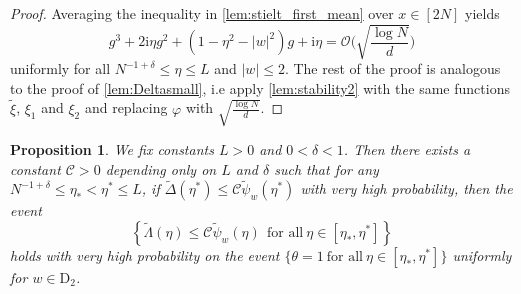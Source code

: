 \documentclass[10pt,a4paper]{amsart}
\newcommand{\ii}{\mathrm{i}}
\newcommand{\abs}[1]{\left| #1 \right|}
\newtheorem{prop}{Proposition}[section]
\numberwithin{equation}{section}
\begin{document}
	\begin{proof}
		Averaging the inequality in \cref{lem:stielt_first_mean} over $x \in [2N]$ yields  
		\begin{equation*}
			g^3  + 2 \ii \eta g^2 +(1 - \eta^2 - \abs{w}^2)g+ \ii \eta  = \mathcal{O} \bigg(\sqrt{\frac{\log N}{d}}\bigg) 
		\end{equation*}
		uniformly for all $N^{-1+ \delta} \le \eta \le L$ and $\abs{w} \le 2$. The rest of the proof is analogous to the proof of \cref{lem:Deltasmall}, i.e apply \cref{lem:stability2} with the same functions $\widetilde{\xi}$, $\xi_1$ and $\xi_2$ and replacing $\varphi$ with $\sqrt{\frac{\log N}{d}}$.
	\end{proof}
	\begin{prop}\label{prop:phi_Lambda_small3new}
		We fix constants $L >0$ and $0 < \delta <1 $. Then there exists a constant $\mathcal{C} >0$ depending only on $L$ and $\delta$ such that for any $N^{-1+ \delta} \le \eta_{\ast} < \eta^{\ast} \le L$, if $\widetilde{\Delta}(\eta^*) \leq \mathcal C \widetilde{\psi}_w(\eta^*)$ with very high probability, then the event 
		\begin{equation*}
			\left\{  \widetilde{\Lambda}(\eta)\le \mathcal{C} \widetilde{\psi}_w(\eta)  ~~\text{for all}~ \eta \in [ \eta_{\ast}, \eta^{\ast}] \right\}
		\end{equation*}
		holds with very high probability on the event $\{ \theta =1 ~\text{for all} ~ \eta \in [\eta_{\ast}, \eta^{\ast}]\}$ 
		uniformly for $w \in \mathrm{D}_2$. 
	\end{prop}

	
\end{document}

